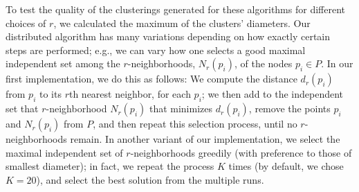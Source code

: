 

To test the quality of the clusterings generated for these algorithms for different choices of $r$, we calculated the maximum of the clusters' diameters. Our distributed algorithm has many variations depending on how exactly certain steps are performed; e.g., we can vary how one selects a good maximal independent set among the $r$-neighborhoods, $N_r(p_i)$, of the nodes $p_i\in P$. In our first implementation, we do this as follows: We compute the distance $d_r(p_i)$ from $p_i$ to its $r$th nearest neighbor, for each $p_i$; we then add to the independent set that $r$-neighborhood $N_r(p_i)$ that minimizes $d_r(p_i)$, remove the points $p_i$ and $N_r(p_i)$ from $P$, and then repeat this selection process, until no $r$-neighborhoods remain.  In another variant of our implementation, we select the maximal independent set of $r$-neighborhoods greedily (with preference to those of smallest diameter); in fact, we repeat the process $K$ times (by default, we chose $K=20$), and select the best solution from the multiple runs.


